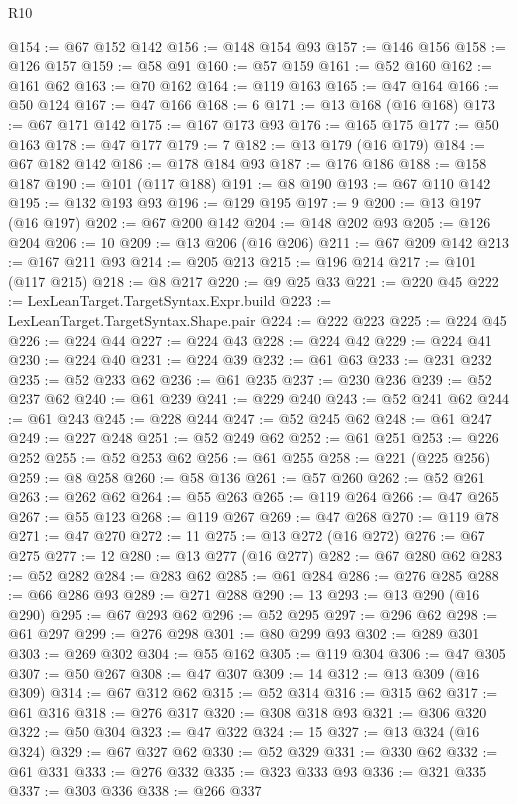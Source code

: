 \begin{lexlean}{R10}
\begin{coremodule}
@154 := @67 @152 @142
@156 := @148 @154 @93
@157 := @146 @156
@158 := @126 @157
@159 := @58 @91
@160 := @57 @159
@161 := @52 @160
@162 := @161 @62
@163 := @70 @162
@164 := @119 @163
@165 := @47 @164
@166 := @50 @124
@167 := @47 @166
@168 := 6
@171 := @13 @168 (@16 @168)
@173 := @67 @171 @142
@175 := @167 @173 @93
@176 := @165 @175
@177 := @50 @163
@178 := @47 @177
@179 := 7
@182 := @13 @179 (@16 @179)
@184 := @67 @182 @142
@186 := @178 @184 @93
@187 := @176 @186
@188 := @158 @187
@190 := @101 (@117 @188)
@191 := @8 @190
@193 := @67 @110 @142
@195 := @132 @193 @93
@196 := @129 @195
@197 := 9
@200 := @13 @197 (@16 @197)
@202 := @67 @200 @142
@204 := @148 @202 @93
@205 := @126 @204
@206 := 10
@209 := @13 @206 (@16 @206)
@211 := @67 @209 @142
@213 := @167 @211 @93
@214 := @205 @213
@215 := @196 @214
@217 := @101 (@117 @215)
@218 := @8 @217
@220 := @9 @25 @33
@221 := @220 @45
@222 := LexLeanTarget.TargetSyntax.Expr.build
@223 := LexLeanTarget.TargetSyntax.Shape.pair
@224 := @222 @223
@225 := @224 @45
@226 := @224 @44
@227 := @224 @43
@228 := @224 @42
@229 := @224 @41
@230 := @224 @40
@231 := @224 @39
@232 := @61 @63
@233 := @231 @232
@235 := @52 @233 @62
@236 := @61 @235
@237 := @230 @236
@239 := @52 @237 @62
@240 := @61 @239
@241 := @229 @240
@243 := @52 @241 @62
@244 := @61 @243
@245 := @228 @244
@247 := @52 @245 @62
@248 := @61 @247
@249 := @227 @248
@251 := @52 @249 @62
@252 := @61 @251
@253 := @226 @252
@255 := @52 @253 @62
@256 := @61 @255
@258 := @221 (@225 @256)
@259 := @8 @258
@260 := @58 @136
@261 := @57 @260
@262 := @52 @261
@263 := @262 @62
@264 := @55 @263
@265 := @119 @264
@266 := @47 @265
@267 := @55 @123
@268 := @119 @267
@269 := @47 @268
@270 := @119 @78
@271 := @47 @270
@272 := 11
@275 := @13 @272 (@16 @272)
@276 := @67 @275
@277 := 12
@280 := @13 @277 (@16 @277)
@282 := @67 @280 @62
@283 := @52 @282
@284 := @283 @62
@285 := @61 @284
@286 := @276 @285
@288 := @66 @286 @93
@289 := @271 @288
@290 := 13
@293 := @13 @290 (@16 @290)
@295 := @67 @293 @62
@296 := @52 @295
@297 := @296 @62
@298 := @61 @297
@299 := @276 @298
@301 := @80 @299 @93
@302 := @289 @301
@303 := @269 @302
@304 := @55 @162
@305 := @119 @304
@306 := @47 @305
@307 := @50 @267
@308 := @47 @307
@309 := 14
@312 := @13 @309 (@16 @309)
@314 := @67 @312 @62
@315 := @52 @314
@316 := @315 @62
@317 := @61 @316
@318 := @276 @317
@320 := @308 @318 @93
@321 := @306 @320
@322 := @50 @304
@323 := @47 @322
@324 := 15
@327 := @13 @324 (@16 @324)
@329 := @67 @327 @62
@330 := @52 @329
@331 := @330 @62
@332 := @61 @331
@333 := @276 @332
@335 := @323 @333 @93
@336 := @321 @335
@337 := @303 @336
@338 := @266 @337

\end{coremodule}
\end{lexlean}
